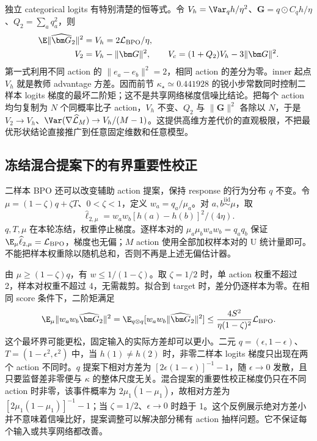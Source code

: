 独立 categorical logits 有特别清楚的恒等式。令 $V_h=\Var_qh/\eta^2$、$\bm G=q\odot C_qh/\eta$、$Q_2=\sum_aq_a^2$，则
\begin{align}
 \E\|\widehat{\bm G}_2\|^2&=V_h=2\mathcal L_{\mathrm{BPO}}/\eta,\\
 V_2&=V_h-\|\bm G\|^2,\qquad
 V_c=(1+Q_2)V_h-3\|\bm G\|^2.
\end{align}
第一式利用不同 action 的 $\|e_a-e_b\|^2=2$，相同 action 的差分为零。inner 起点 $V_h$ 就是教师 advantage 方差。因而前节 $\kappa_\star\simeq0.441928$ 的锐小步常数同时控制二样本 logits 梯度的最坏二阶矩；这不是共享网络梯度信噪比结论。把每个 action 均匀复制为 $N$ 个同概率比子 action，$V_h$ 不变、$Q_2$ 与 $\|\bm G\|^2$ 各除以 $N$，于是 $V_2\to V_h$、$\Var(\nabla\widehat{\mathcal L}_M)\to V_h/(M-1)$。这提供高维方差代价的直观极限，不把最优形状结论直接推广到任意固定维数和任意模型。
\subsection{冻结混合提案下的有界重要性校正}

二样本 BPO 还可以改变辅助 action 提案，保持 response 的行为分布 $q$ 不变。令 $\mu=(1-\zeta)q+\zeta T$、$0<\zeta<1$，定义 $w_a=q_a/\mu_a$。对 $a,b\overset{\mathrm{iid}}\sim\mu$，取
\begin{equation}
 \widehat\ell_{2,\mu}=w_aw_b[h(a)-h(b)]^2/(4\eta).
\end{equation}
$q,T,\mu$ 在本轮冻结，权重停止梯度。逐样本对的 $\mu_a\mu_bw_aw_b=q_aq_b$ 保证 $\E_\mu\widehat\ell_{2,\mu}=\mathcal L_{\mathrm{BPO}}$，梯度也无偏；$M$ action 使用全部加权样本对的 U 统计量即可。不能把样本权重除以随机总和，否则不再是上述无偏估计器。

由 $\mu\ge(1-\zeta)q$，有 $w\le1/(1-\zeta)$。取 $\zeta=1/2$ 时，单 action 权重不超过 2，样本对权重不超过 4，无需裁剪。拟合到 target 时，差分仍逐样本为零。在相同 score 条件下，二阶矩满足
\begin{equation}
 \E_\mu\|w_aw_b\widehat{\bm G}_2\|^2
 =\E_{q\otimes q}[w_aw_b\|\widehat{\bm G}_2\|^2]
 \le\frac{4S^2}{\eta(1-\zeta)^2}\mathcal L_{\mathrm{BPO}}.
\end{equation}
这个最坏界可能更松，固定输入的实际方差却可以更小。二元 $q=(\epsilon,1-\epsilon)$、$T=(1-\epsilon^2,\epsilon^2)$ 中，当 $h(1)\ne h(2)$ 时，非零二样本 logits 梯度只出现在两个 action 不同时。$q$ 提案下相对方差为 $[2\epsilon(1-\epsilon)]^{-1}-1$，随 $\epsilon\to0$ 发散，且只要监督差非零便与 $\kappa$ 的整体尺度无关。混合提案的重要性校正梯度仍只在不同 action 时非零，该事件概率为 $2\mu_1(1-\mu_1)$，故相对方差为 $[2\mu_1(1-\mu_1)]^{-1}-1$；当 $\zeta=1/2$、$\epsilon\to0$ 时趋于 1。这个反例展示绝对方差小并不意味着信噪比好，提案调整可以解决部分稀有 action 抽样问题。它不保证每个输入或共享网络都改善。
